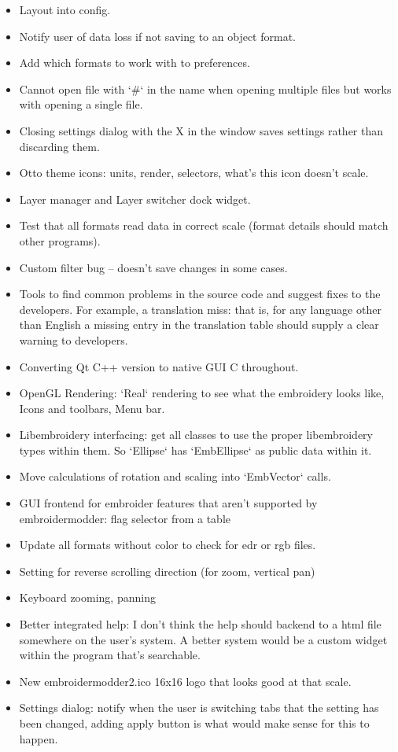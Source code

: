 \begin{itemize}
  \item Layout into config.
  \item Notify user of data loss if not saving to an object format.
  \item Add which formats to work with to preferences.
  \item Cannot open file with `\#` in the name when opening multiple files but works with opening a single file.
  \item Closing settings dialog with the X in the window saves settings rather than discarding them.
  \item Otto theme icons: units, render, selectors, what's this icon doesn't scale.
  \item Layer manager and Layer switcher dock widget.
  \item Test that all formats read data in correct scale (format details should match other programs).
  \item Custom filter bug -- doesn't save changes in some cases.
  \item Tools to find common problems in the source code and suggest fixes to the developers. For example, a translation miss: that is, for any language other than English a missing entry in the translation table should supply a clear warning to developers.
  \item Converting Qt C++ version to native GUI C throughout.
  \item OpenGL Rendering: `Real` rendering to see what the embroidery looks like, Icons and toolbars, Menu bar.
  \item Libembroidery interfacing: get all classes to use the proper libembroidery types within them. So `Ellipse` has `EmbEllipse` as public data within it.
  \item Move calculations of rotation and scaling into `EmbVector` calls.
  \item GUI frontend for embroider features that aren't supported by embroidermodder: flag selector from a table
  \item Update all formats without color to check for edr or rgb files.
  \item Setting for reverse scrolling direction (for zoom, vertical pan)
  \item Keyboard zooming, panning
  \item Better integrated help: I don't think the help should backend to a html file somewhere on the user's system. A better system would be a custom widget within the program that's searchable.
  \item New embroidermodder2.ico 16x16 logo that looks good at that scale.
  \item Settings dialog: notify when the user is switching tabs that the setting has been changed, adding apply button is what would make sense for this to happen.
\end{itemize}

